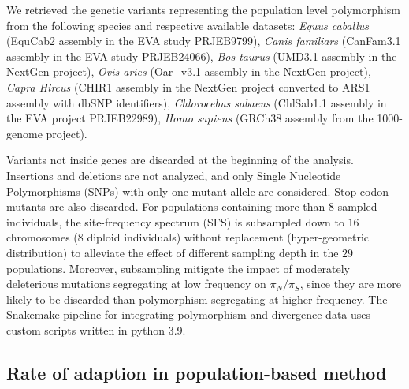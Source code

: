 \documentclass[9pt,twocolumn,twoside,lineno]{pnas-new}
\newcommand{\pn}{\pi_N}
\newcommand{\ps}{\pi_S}
\newcommand{\pnps}{\pn / \ps}
\begin{document}
{       We retrieved the genetic variants representing the population level polymorphism from the following species and respective available datasets: \textit{Equus caballus} (EquCab2 assembly in the EVA study PRJEB9799\cite{alabri_whole_2020}), \textit{Canis familiars} (CanFam3.1 assembly in the EVA study PRJEB24066\cite{jagannathan_comprehensive_2019}),  \textit{Bos taurus} (UMD3.1 assembly in the NextGen project), \textit{Ovis aries} (Oar\_v3.1 assembly in the NextGen project), \textit{Capra Hircus} (CHIR1 assembly in the NextGen project converted to ARS1 assembly with dbSNP identifiers\cite{sherry_dbsnp_2001}), \textit{Chlorocebus sabaeus} (ChlSab1.1 assembly in the EVA project PRJEB22989\cite{svardal_ancient_2017}), \textit{Homo sapiens} (GRCh38 assembly from the 1000-genome project\cite{consortium_integrated_2012, the1000genomesprojectconsortium_global_2015}).

       Variants not inside genes are discarded at the beginning of the analysis.
       Insertions and deletions are not analyzed, and only Single Nucleotide Polymorphisms (SNPs) with only one mutant allele are considered.
       Stop codon mutants are also discarded.
       For populations containing more than $8$ sampled individuals, the site-frequency spectrum (SFS) is subsampled down to $16$ chromosomes ($8$ diploid individuals) without replacement (hyper-geometric distribution) to alleviate the effect of different sampling depth in the $29$ populations.
       Moreover, subsampling mitigate the impact of moderately deleterious mutations segregating at low frequency on $\pnps$, since they are more likely to be discarded than polymorphism segregating at higher frequency.
       The Snakemake pipeline for integrating polymorphism and divergence data uses custom scripts written in python 3.9.

       \subsection*{Rate of adaption in population-based method}

}
\end{document}
